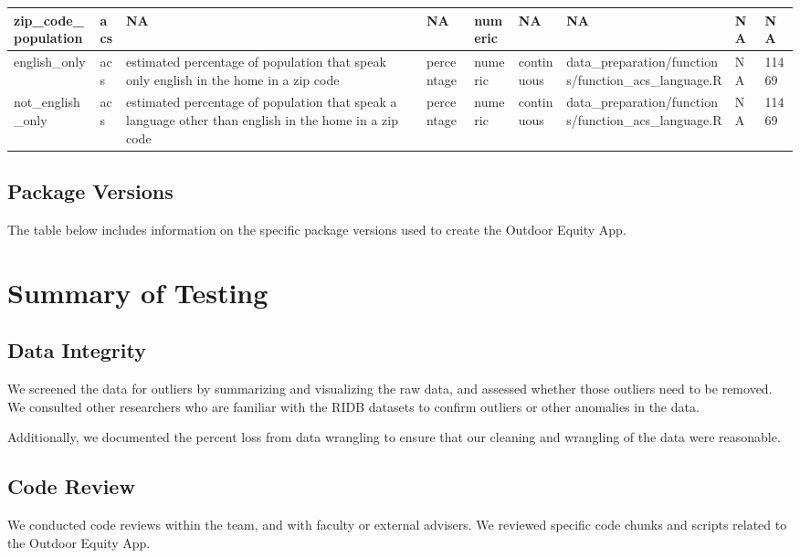 \documentclass[
]{book}
\begin{document}
\begin{table}
{\begin{tabular}[t]{l|l|l|l|l|l|l|l|l}
\hline
zip\_code\_population & acs & NA & NA & numeric & NA & NA & NA & NA\\
\hline
english\_only & acs & estimated percentage of population that speak only english in the home in a zip code & percentage & numeric & continuous & data\_preparation/functions/function\_acs\_language.R & NA & 11469\\
\hline
not\_english\_only & acs & estimated percentage of population that speak a language other than english in the home in a zip code & percentage & numeric & continuous & data\_preparation/functions/function\_acs\_language.R & NA & 11469\\
\hline
\end{tabular}}
\end{table}

\hypertarget{package-versions}{%
\section{Package Versions}\label{package-versions}}

The table below includes information on the specific package versions used to create the Outdoor Equity App.

\hypertarget{summary-of-testing}{%
\chapter{Summary of Testing}\label{summary-of-testing}}

\hypertarget{data-integrity}{%
\section{Data Integrity}\label{data-integrity}}

We screened the data for outliers by summarizing and visualizing the raw data, and assessed whether those outliers need to be removed. We consulted other researchers who are familiar with the RIDB datasets to confirm outliers or other anomalies in the data.

Additionally, we documented the percent loss from data wrangling to ensure that our cleaning and wrangling of the data were reasonable.

\hypertarget{code-review}{%
\section{Code Review}\label{code-review}}

We conducted code reviews within the team, and with faculty or external advisers. We reviewed specific code chunks and scripts related to the Outdoor Equity App.
\end{document}
